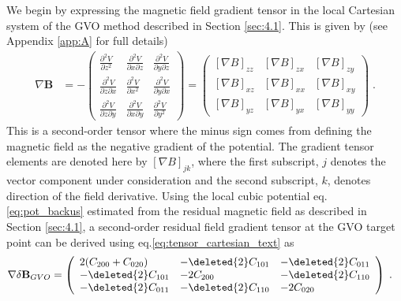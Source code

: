 \documentclass[extra,mreferee]{gji}
\begin{document}
We begin by expressing the magnetic field gradient tensor in the local Cartesian system of the GVO method described in Section \ref{sec:4.1}. This is given by (see Appendix \ref{app:A} for full details) 
\begin{align}
\nabla \mathbf{B} &=  - \left(
\begin{array}{lll}
\frac{\partial^2 V}{\partial z^2}          & \frac{\partial^2 V}{\partial x \partial z} & \frac{\partial^2 V}{\partial y \partial z} \\
\frac{\partial^2 V}{\partial z \partial x} & \frac{\partial^2 V}{\partial x^2}          & \frac{\partial^2 V}{\partial y \partial x} \\
\frac{\partial^2 V}{\partial z \partial y} & \frac{\partial^2 V}{\partial x \partial y} & \frac{\partial^2 V}{\partial y^2}
\end{array}\right)= 
\left(
\begin{array}{lll}
\left[\nabla B\right]_{zz}          & \left[\nabla B\right]_{zx}  & \left[\nabla B\right]_{zy} \\
\left[\nabla B\right]_{xz}          & \left[\nabla B\right]_{xx}  & \left[\nabla B\right]_{xy} \\
\left[\nabla B\right]_{yz}          & \left[\nabla B\right]_{yx}  & \left[\nabla B\right]_{yy}
\end{array}\right) \; .  \label{eq:tensor_cartesian_text}
\end{align}
This is a second-order tensor where the minus sign comes from defining the magnetic field as the negative gradient of the potential. The gradient tensor elements are denoted here by $\left[\nabla B \right]_{jk}$, where the first subscript, $j$ denotes the vector component under consideration and the second subscript, $k$, denotes direction of the field derivative. Using the local cubic potential eq.\eqref{eq:pot_backus} estimated from the residual magnetic field as described in Section \ref{sec:4.1}, a second-order residual field gradient tensor at the GVO target point can be derived using eq.\eqref{eq:tensor_cartesian_text} as
\begin{align}
\nabla \delta \mathbf{B}_{GVO} &= \left(
\begin{array}{lll}
2(C_{200}+C_{020})   & -\deleted{2}C_{101}  & -\deleted{2}C_{011}  \\
-\deleted{2}C_{101}            & -2C_{200}  & -\deleted{2}C_{110} \\
-\deleted{2}C_{011}            & -\deleted{2}C_{110} & -2C_{020}
\end{array}\right) \; .  \label{eq:GVO_tensor_cartesian}
\end{align}
\end{document}

